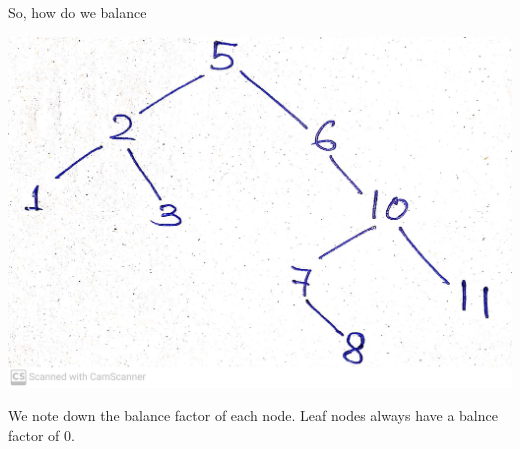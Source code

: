 \documentclass[10pt, a4paper]{extarticle}
\theoremstyle{definition}
\begin{document}
So, how do we balance
\begin{center}
	\includegraphics[scale=0.08]{bst1.jpg}\\
\end{center}
We note down the balance factor of each node. Leaf nodes always have a balnce factor of 0.
\end{document}

